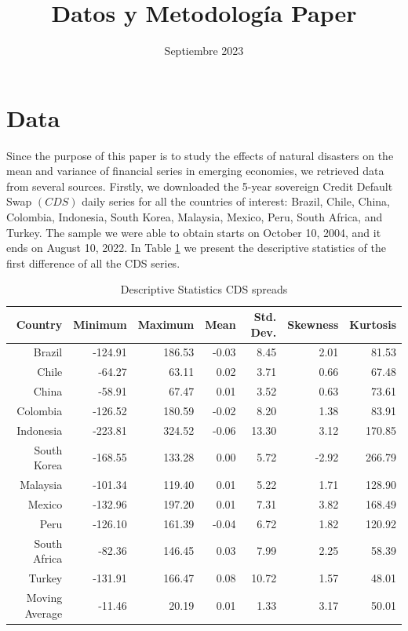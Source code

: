 \documentclass{article}
\title{Datos y Metodología Paper}
\author{}
\date{Septiembre 2023}
\begin{document}
\maketitle

\section{Data}
Since the purpose of this paper is to study the effects of natural disasters on the mean and variance 
of financial series in emerging economies, we retrieved data from several sources. Firstly, we 
downloaded the 5-year sovereign Credit Default Swap $(CDS)$ daily series for all the countries of 
interest: Brazil, Chile, China, Colombia, Indonesia, South Korea, Malaysia, Mexico, Peru, South Africa, and Turkey. 
The sample we were able to obtain starts on October 10, 2004, and it ends on August 10, 2022. In Table \ref{table:CDS}
 we present the descriptive statistics of the first difference of all the CDS series. \\
\begin{table}[H]
\centering
\small
\begin{tabular}{rrrrrrr}
  \hline
Country & Minimum & Maximum & Mean & Std. Dev. & Skewness & Kurtosis \\ 
  \hline
Brazil & -124.91 & 186.53 & -0.03 & 8.45 & 2.01 & 81.53 \\ 
  Chile & -64.27 & 63.11 & 0.02 & 3.71 & 0.66 & 67.48 \\ 
  China & -58.91 & 67.47 & 0.01 & 3.52 & 0.63 & 73.61 \\ 
  Colombia & -126.52 & 180.59 & -0.02 & 8.20 & 1.38 & 83.91 \\ 
  Indonesia & -223.81 & 324.52 & -0.06 & 13.30 & 3.12 & 170.85 \\ 
  South Korea & -168.55 & 133.28 & 0.00 & 5.72 & -2.92 & 266.79 \\ 
  Malaysia & -101.34 & 119.40 & 0.01 & 5.22 & 1.71 & 128.90 \\ 
  Mexico & -132.96 & 197.20 & 0.01 & 7.31 & 3.82 & 168.49 \\ 
  Peru & -126.10 & 161.39 & -0.04 & 6.72 & 1.82 & 120.92 \\ 
  South Africa & -82.36 & 146.45 & 0.03 & 7.99 & 2.25 & 58.39 \\ 
  Turkey & -131.91 & 166.47 & 0.08 & 10.72 & 1.57 & 48.01 \\ 
  Moving Average & -11.46 & 20.19 & 0.01 & 1.33 & 3.17 & 50.01 \\ 
   \hline
\end{tabular}
\caption{Descriptive Statistics CDS spreads}
\label{table:CDS}
\end{table}
\end{document}
